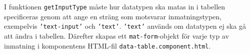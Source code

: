 \documentclass[techdoc/techdoc.tex]{subfiles}
\begin{document}
I funktionen \texttt{getInputType} måste hur datatypen ska matas in i tabellen
specificeras genom att ange en sträng som motsvarar inmatningstypen, exempelvis
\texttt{'text-input'} och \texttt{'text'}. \texttt{'text'} används om datatypen
ej ska gå att ändra i tabellen. Därefter skapas ett \texttt{mat-form}-objekt
för varje typ av inmatning i komponentens HTML-fil
\texttt{data-table.component.html}.




\end{document}
